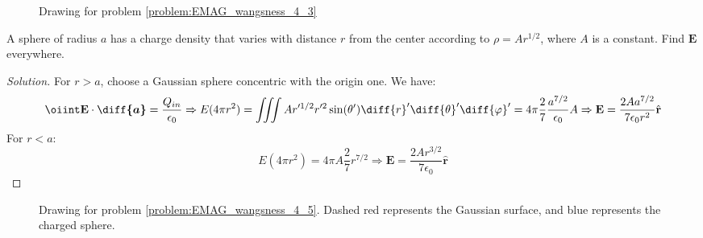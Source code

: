             \begin{figure}
                \centering
                \captionsetup{type=figure}
                
                \caption[Drawing for Wangsness 4-3]
                {Drawing for problem \ref{problem:EMAG_wangsness_4_3}}
                \label{fig:EMAG_1_Wangsness_4_3}
            \end{figure}
            \begin{problem}[Wangsness 4-5]
                \label{problem:EMAG_wangsness_4_5}
                A sphere of radius $a$ has a charge density that varies
                with distance $r$ from the center according to
                $\rho=Ar^{1/2}$, where $A$ is a constant.
                Find $\mathbf{E}$ everywhere.
            \end{problem}
            \begin{proof}[Solution]
                For $r>a$, choose a Gaussian sphere concentric with
                the origin one. We have:
                \begin{equation*}
                    \oiint\mathbf{E}\cdot\boldsymbol{\diff{a}}
                    =\frac{Q_{in}}{\epsilon_{0}}\Rightarrow
                    E(4\pi r^{2})
                    =\iiint{A}r'^{1/2}r'^{2}
                    \sin(\theta')\diff{r}'\diff{\theta}'\diff{\varphi}'
                    =4\pi\frac{2}{7}\frac{a^{7/2}}{\epsilon_{0}}A
                    \Rightarrow\mathbf{E}
                    =\frac{2Aa^{7/2}}{7\epsilon_{0}r^{2}}\hat{\mathbf{r}}
                \end{equation*}
                For $r<a$:
                \begin{equation*}
                    E(4\pi r^{2})
                    =4\pi A\frac{2}{7}r^{7/2}\Rightarrow
                    \mathbf{E}
                    =\frac{2Ar^{3/2}}{7\epsilon_{0}}\hat{\mathbf{r}}
                \end{equation*}
            \end{proof}
            \begin{figure}[H]
                \centering
                \captionsetup{type=figure}
                
                \caption[Drawing for Wangsness 4-3]{%
                    Drawing for problem \ref{problem:EMAG_wangsness_4_5}.
                    Dashed red represents the Gaussian surface,
                    and blue represents the charged sphere.
                }
                \label{fig:EMAG_1_Wangsness_4_5}
            \end{figure}
